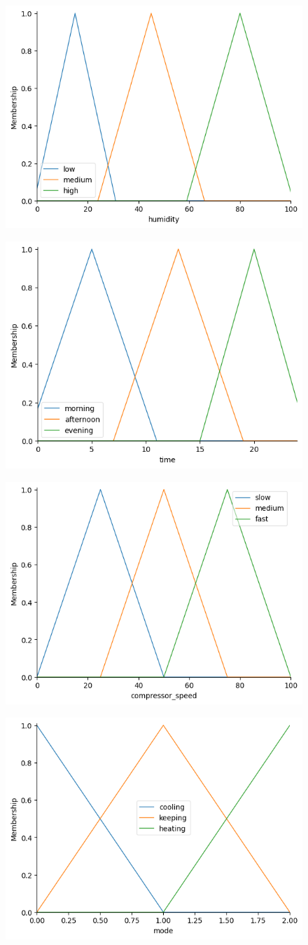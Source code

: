 \documentclass{article}
\begin{document}
    \begin{figure}[H]
        \centering
        \includegraphics[width=0.6\linewidth]{humidity.png}
    \end{figure}
    
    \begin{figure}[H]
        \centering
        \includegraphics[width=0.6\linewidth]{time.png}
    \end{figure}

    \begin{figure}[H]
        \centering
        \includegraphics[width=0.6\linewidth]{compressor_speed.png}
    \end{figure}

    \begin{figure}[H]
        \centering
        \includegraphics[width=0.6\linewidth]{mode.png}
    \end{figure}
\end{document}
